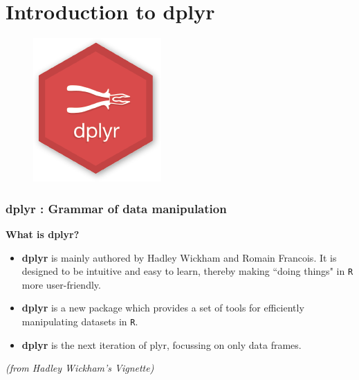 \documentclass{beamer}
\begin{document}
\section{Introduction to dplyr}
\begin{frame}
	\begin{figure}
\centering
\includegraphics[width=0.7\linewidth]{images/dplyr-hexbin-logo}

\end{figure}

\end{frame}
	\begin{frame}[fragile]
		\frametitle{dplyr : Grammar of data manipulation}
		\Large
		\textbf{What is dplyr?}
		\begin{itemize}
			\item \textbf{dplyr} is mainly authored by Hadley Wickham and Romain Francois. It is designed to be intuitive and easy to learn, thereby making ``doing things" in \texttt{R} more user-friendly.
			\item \textbf{dplyr} is a new package which provides a set of tools for efficiently manipulating datasets in \texttt{R}.
			\item \textbf{dplyr} is the next iteration of plyr, focussing on only data frames. 
		\end{itemize}\smallskip
		\textit{(from Hadley Wickham's Vignette)}
\end{frame}
\end{document}

